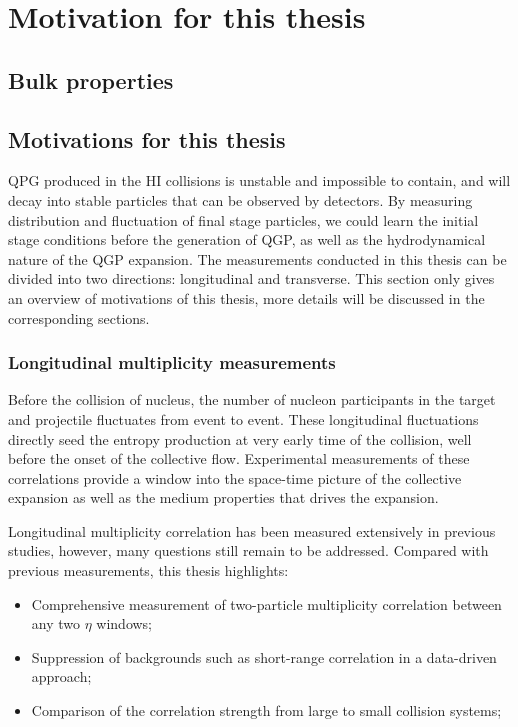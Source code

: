 \section{Motivation for this thesis}

\subsection{Bulk properties}



\subsection{Motivations for this thesis}

QPG produced in the HI collisions is unstable and impossible to contain, and will decay into stable particles that can be observed by detectors. By measuring distribution and fluctuation of final stage particles, we could learn the initial stage conditions before the generation of QGP, as well as the hydrodynamical nature of the QGP expansion. The measurements conducted in this thesis can be divided into two directions: longitudinal and transverse. This section only gives an overview of motivations of this thesis, more details will be discussed in the corresponding sections.



\subsubsection{Longitudinal multiplicity measurements}

Before the collision of nucleus, the number of nucleon participants in the target and projectile fluctuates from event to event.  These longitudinal fluctuations directly seed the entropy production at very early time of the collision, well before the onset of the collective flow. Experimental measurements of these correlations provide a window into the space-time picture of the collective expansion as well as the medium properties that drives the expansion.

Longitudinal multiplicity correlation has been measured extensively in previous studies, however, many questions still remain to be addressed. Compared with previous measurements, this thesis highlights:
\begin{itemize}
\item Comprehensive measurement of two-particle multiplicity correlation between any two $\eta$ windows;
\item Suppression of backgrounds such as short-range correlation in a data-driven approach;
\item Comparison of the correlation strength from large to small collision systems;
\end{itemize}



